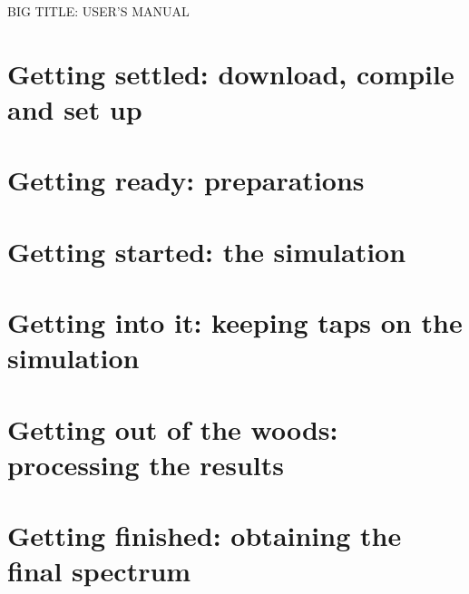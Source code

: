 \documentclass[a4paper,fleqn]{report}
\begin{document}
	
	BIG TITLE: USER'S MANUAL
	
	\tableofcontents
	
	\chapter{Getting settled: download, compile and set up}
	
	\chapter{Getting ready: preparations}
	
	\chapter{Getting started: the simulation}
	
	\chapter{Getting into it: keeping taps on the simulation}
	
	\chapter{Getting out of the woods: processing the results}
	
	\chapter{Getting finished: obtaining the final spectrum}
	
\end{document}
